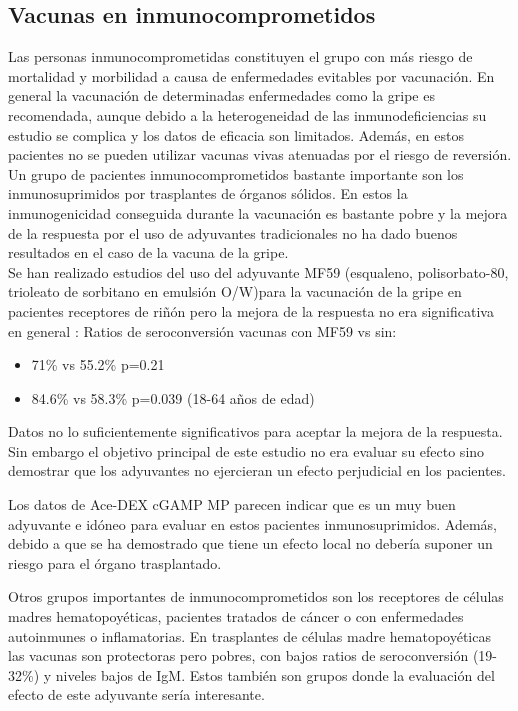 \documentclass[a4paper,11pt]{article}
\begin{document}
\subsection{Vacunas en inmunocomprometidos}
Las personas inmunocomprometidas constituyen el grupo con más riesgo de mortalidad y morbilidad a causa de enfermedades evitables por vacunación. En general la vacunación de determinadas enfermedades como la gripe es recomendada, aunque debido a la heterogeneidad de las inmunodeficiencias su estudio se complica y los datos de eficacia son limitados. \cite{inmunodef} Además, en estos pacientes no se pueden utilizar vacunas vivas atenuadas por el riesgo de reversión. 
\\Un grupo de pacientes inmunocomprometidos bastante importante son los inmunosuprimidos por trasplantes de órganos sólidos. En estos la inmunogenicidad conseguida durante la vacunación es bastante pobre y la mejora de la respuesta por el uso de adyuvantes tradicionales no ha dado buenos resultados en el caso de la vacuna de la gripe. 
\\Se han realizado estudios del uso del adyuvante MF59 (esqualeno, polisorbato-80, trioleato de sorbitano en emulsión O/W)para la vacunación de la gripe en pacientes receptores de riñón pero la mejora de la respuesta no era significativa en general \cite{inmunodef2}:
Ratios de seroconversión vacunas con MF59 vs sin:
\begin{itemize}
	\item 71\% vs 55.2\% p=0.21
	\item 84.6\% vs 58.3\% p=0.039 (18-64 años de edad)
\end{itemize}
Datos no lo suficientemente significativos para aceptar la mejora de la respuesta. Sin embargo el objetivo principal de este estudio no era evaluar su efecto sino demostrar que los adyuvantes no ejercieran un efecto perjudicial en los pacientes.

Los datos de Ace-DEX cGAMP MP parecen indicar que es un muy buen adyuvante e idóneo para evaluar en estos pacientes inmunosuprimidos. Además, debido a que se ha demostrado que tiene un efecto local no debería suponer un riesgo para el órgano trasplantado. 

Otros grupos importantes de inmunocomprometidos son los receptores de células madres hematopoyéticas, pacientes tratados de cáncer o con enfermedades autoinmunes o inflamatorias. En trasplantes de células madre hematopoyéticas las vacunas son protectoras pero pobres, con bajos ratios de seroconversión (19-32\%) y niveles bajos de IgM. Estos también son grupos donde la evaluación del efecto de este adyuvante sería interesante.
\end{document}
